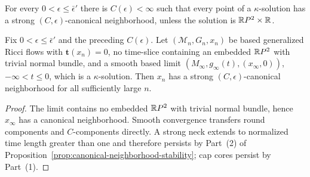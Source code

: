 \begin{corollary}\label{cor:canonical-neighborhood-existence}
\label{kappacannbhd}

For every $0<\epsilon\leq\bar\epsilon'$ there is
$C(\epsilon)<\infty$ such that every point of a $\kappa$-solution
has a strong $(C,\epsilon)$-canonical neighborhood, unless the
solution is $\mathbb{R} P^2\times\mathbb{R}$.
\end{corollary}

\begin{corollary}\label{cor:canonical-neighborhood-limit-passage}
\label{limitcannbhd}

Fix $0<\epsilon\leq\bar\epsilon'$ and the preceding $C(\epsilon)$.
Let $(\mathcal M_n,G_n,x_n)$ be based generalized Ricci flows with
$\mathbf t(x_n)=0$, no time-slice containing an embedded
$\mathbb{R} P^2$ with trivial normal bundle, and a smooth based limit
$(M_\infty,g_\infty(t),(x_\infty,0))$, $-\infty<t\leq0$, which is
a $\kappa$-solution. Then $x_n$ has a strong
$(C,\epsilon)$-canonical neighborhood for all sufficiently large
$n$.
\end{corollary}
\begin{proof}
\sketch
{}
The limit contains no embedded $\mathbb{R} P^2$ with trivial normal
bundle, hence $x_\infty$ has a canonical neighborhood. Smooth
convergence transfers round components and $C$-components directly.
A strong neck extends to normalized time length greater than one and
therefore persists by Part~(2) of
Proposition~\ref{prop:canonical-neighborhood-stability}; cap cores
persist by Part~(1).
\end{proof}
